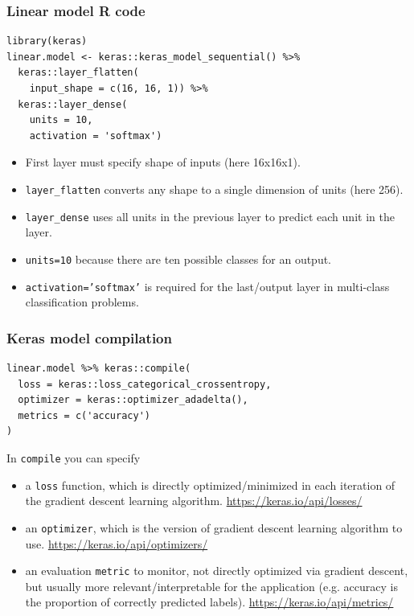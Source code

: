 \documentclass{beamer}
\begin{document}
\begin{frame}[fragile]
  \frametitle{Linear model R code}

\begin{verbatim}
library(keras)
linear.model <- keras::keras_model_sequential() %>%
  keras::layer_flatten(
    input_shape = c(16, 16, 1)) %>%
  keras::layer_dense(
    units = 10,
    activation = 'softmax')
\end{verbatim}

  \begin{itemize}
  \item First layer must specify shape of inputs (here 16x16x1).
  \item \texttt{layer\_flatten} converts any shape to a single dimension
    of units (here 256).
  \item \texttt{layer\_dense} uses all units in the previous layer to
    predict each unit in the layer.
  \item \texttt{units=10} because there are ten possible classes for an output.
  \item \texttt{activation='softmax'} is required for the last/output layer in
    multi-class classification problems.
  \end{itemize}

\end{frame}

\begin{frame}[fragile]
\frametitle{Keras model compilation}
\begin{verbatim}
linear.model %>% keras::compile(
  loss = keras::loss_categorical_crossentropy,
  optimizer = keras::optimizer_adadelta(),
  metrics = c('accuracy')
)
\end{verbatim}
In \texttt{compile} you can specify
\begin{itemize}
\item a \texttt{loss} function, which is directly optimized/minimized
  in each iteration of the gradient descent learning algorithm. 
  \url{https://keras.io/api/losses/} 
\item an \texttt{optimizer}, which is the version of gradient descent
  learning algorithm to use. 
  \url{https://keras.io/api/optimizers/} 
\item an evaluation \texttt{metric} to monitor, not directly optimized
  via gradient descent, but usually more relevant/interpretable for
  the application (e.g. accuracy is the proportion of correctly
  predicted labels). \url{https://keras.io/api/metrics/} 
\end{itemize}
\end{frame}
 
\end{document}
